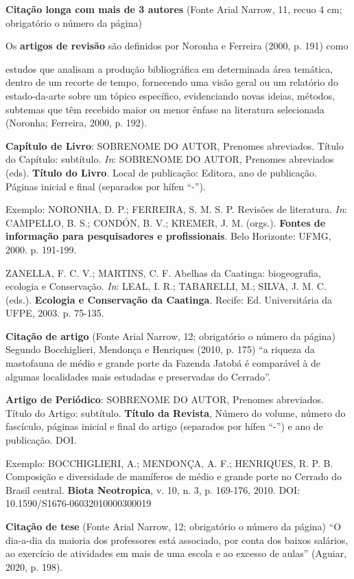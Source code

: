 \textbf{Citação longa com mais de 3 autores} (Fonte Arial Narrow, 11, recuo 4 cm; obrigatório o número da página)

Os \textbf{artigos de revisão} são definidos por Noronha e Ferreira (2000, p. 191) como
\begin{citacao}
estudos que analisam a produção bibliográfica em determinada área temática, dentro de um recorte de tempo, fornecendo uma visão geral ou um relatório do estado-da-arte sobre um tópico específico, evidenciando novas ideias, métodos, subtemas que têm recebido maior ou menor ênfase na literatura selecionada (Noronha; Ferreira, 2000, p. 192).
\end{citacao}

\textbf{Capítulo de Livro}:
SOBRENOME DO AUTOR, Prenomes abreviados. Título do Capítulo: subtítulo. \textit{In}: SOBRENOME DO AUTOR, Prenomes abreviados (eds). \textbf{Título do Livro}. Local de publicação: Editora, ano de publicação. Páginas inicial e final (separados por hífen ``-'').

Exemplo:
NORONHA, D. P.; FERREIRA, S. M. S. P. Revisões de literatura. \textit{In}: CAMPELLO, B. S.; CONDÓN, B. V.; KREMER, J. M. (orgs.). \textbf{Fontes de informação para pesquisadores e profissionais}. Belo Horizonte: UFMG, 2000. p. 191-199.

ZANELLA, F. C. V.; MARTINS, C. F. Abelhas da Caatinga: biogeografia, ecologia e Conservação. \textit{In}: LEAL, I. R.; TABARELLI, M.; SILVA, J. M. C. (eds.). \textbf{Ecologia e Conservação da Caatinga}. Recife: Ed. Universitária da UFPE, 2003. p. 75-135.

\textbf{Citação de artigo} (Fonte Arial Narrow, 12; obrigatório o número da página)
Segundo Bocchiglieri, Mendonça e Henriques (2010, p. 175) ``a riqueza da mastofauna de médio e grande porte da Fazenda Jatobá é comparável à de algumas localidades mais estudadas e preservadas do Cerrado''.

\textbf{Artigo de Periódico}:
SOBRENOME DO AUTOR, Prenomes abreviados. Título do Artigo: subtítulo. \textbf{Título da Revista}, Número do volume, número do fascículo, páginas inicial e final do artigo (separados por hífen ``-'') e ano de publicação. DOI.

Exemplo:
BOCCHIGLIERI, A.; MENDONÇA, A. F.; HENRIQUES, R. P. B. Composição e diversidade de mamíferos de médio e grande porte no Cerrado do Brasil central. \textbf{Biota Neotropica}, v. 10, n. 3, p. 169-176, 2010. DOI: 10.1590/S1676-06032010000300019

\textbf{Citação de tese} (Fonte Arial Narrow, 12; obrigatório o número da página)
``O dia-a-dia da maioria dos professores está associado, por conta dos baixos salários, ao exercício de atividades em mais de uma escola e ao excesso de aulas'' (Aguiar, 2020, p. 198).

